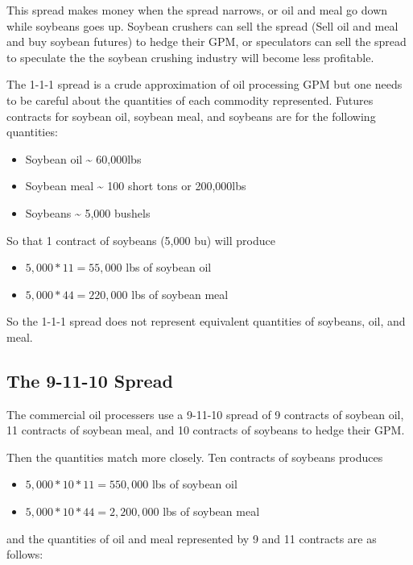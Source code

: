 \documentclass[]{book}
\providecommand{\tightlist}{%
  \setlength{\itemsep}{0pt}\setlength{\parskip}{0pt}}
\theoremstyle{definition}
\theoremstyle{definition}
\theoremstyle{remark}
\begin{document}
This spread makes money when the spread narrows, or oil and meal go down
while soybeans goes up. Soybean crushers can sell the spread (Sell oil
and meal and buy soybean futures) to hedge their GPM, or speculators can
sell the spread to speculate the the soybean crushing industry will
become less profitable.

The 1-1-1 spread is a crude approximation of oil processing GPM but one
needs to be careful about the quantities of each commodity represented.
Futures contracts for soybean oil, soybean meal, and soybeans are for
the following quantities:

\begin{itemize}
\tightlist
\item
  Soybean oil \textasciitilde{} 60,000lbs
\item
  Soybean meal \textasciitilde{} 100 short tons or 200,000lbs
\item
  Soybeans \textasciitilde{} 5,000 bushels
\end{itemize}

So that 1 contract of soybeans (5,000 bu) will produce

\begin{itemize}
\tightlist
\item
  \(5,000*11 = 55,000\) lbs of soybean oil
\item
  \(5,000*44 = 220,000\) lbs of soybean meal
\end{itemize}

So the 1-1-1 spread does not represent equivalent quantities of
soybeans, oil, and meal.

\subsection{The 9-11-10 Spread}\label{the-9-11-10-spread}

The commercial oil processers use a 9-11-10 spread of 9 contracts of
soybean oil, 11 contracts of soybean meal, and 10 contracts of soybeans
to hedge their GPM.

Then the quantities match more closely. Ten contracts of soybeans
produces

\begin{itemize}
\tightlist
\item
  \(5,000*10*11 = 550,000\) lbs of soybean oil
\item
  \(5,000*10*44 = 2,200,000\) lbs of soybean meal
\end{itemize}

and the quantities of oil and meal represented by 9 and 11 contracts are
as follows:
\end{document}
